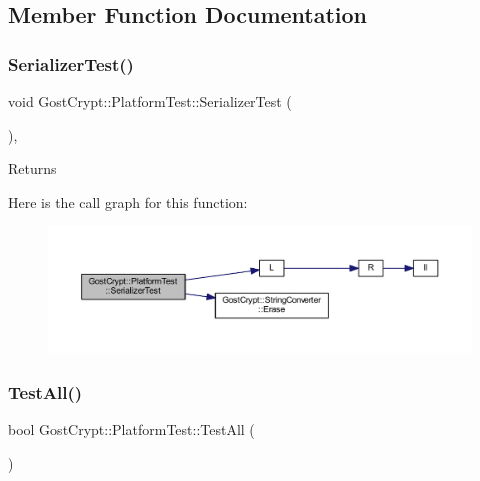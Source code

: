 \subsection{Member Function Documentation}
\mbox{\label{class_gost_crypt_1_1_platform_test_a32e037830a73167f9ac0ce5dc42cb84f}} 
\subsubsection{\texorpdfstring{Serializer\+Test()}{SerializerTest()}}
{\footnotesize\ttfamily void Gost\+Crypt\+::\+Platform\+Test\+::\+Serializer\+Test (\begin{DoxyParamCaption}{ }\end{DoxyParamCaption})\hspace{0.3cm}{\ttfamily [static]}, {\ttfamily [protected]}}

\begin{DoxyReturn}{Returns}

\end{DoxyReturn}
Here is the call graph for this function\+:
\nopagebreak
\begin{figure}[H]
\begin{center}
\leavevmode
\includegraphics[width=350pt]{class_gost_crypt_1_1_platform_test_a32e037830a73167f9ac0ce5dc42cb84f_cgraph}
\end{center}
\end{figure}
\mbox{\label{class_gost_crypt_1_1_platform_test_acce72e087247ae6078a2cc0fd432504c}} 
\subsubsection{\texorpdfstring{Test\+All()}{TestAll()}}
{\footnotesize\ttfamily bool Gost\+Crypt\+::\+Platform\+Test\+::\+Test\+All (\begin{DoxyParamCaption}{ }\end{DoxyParamCaption})\hspace{0.3cm}{\ttfamily [static]}}

